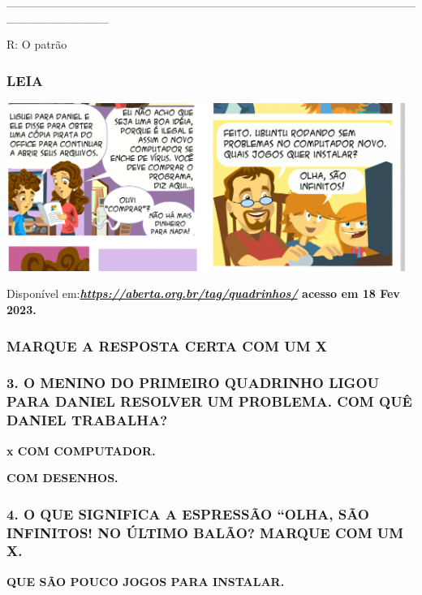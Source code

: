 \_\_\_\_\_\_\_\_\_\_\_\_\_\_\_\_\_\_\_\_\_\_\_\_\_\_\_\_\_\_\_\_\_\_\_\_\_\_\_\_\_\_\_\_\_\_\_\_\_\_\_\_\_\_\_\_\_\_\_\_

R: O patrão

\subsubsection{LEIA}\label{leia-2}

\includegraphics[width=5.11873in,height=2.15447in]{media/image172.png}

Disponível
em:\textbf{\href{https://aberta.org.br/tag/quadrinhos/}{\emph{https://aberta.org.br/tag/quadrinhos/}}
acesso em 18 Fev 2023.}

\subsubsection{MARQUE A RESPOSTA CERTA COM UM X
}\label{marque-a-resposta-certa-com-um-x}

\subsubsection{3. O MENINO DO PRIMEIRO QUADRINHO LIGOU PARA DANIEL
RESOLVER UM PROBLEMA. COM QUÊ DANIEL
TRABALHA?}\label{o-menino-do-primeiro-quadrinho-ligou-para-daniel-resolver-um-problema.-com-quuxea-daniel-trabalha}

\textbf{x COM COMPUTADOR.}

\textbf{COM DESENHOS.}

\subsubsection{4. O QUE SIGNIFICA A ESPRESSÃO ``OLHA, SÃO INFINITOS! NO
ÚLTIMO BALÃO? MARQUE COM UM
X.}\label{o-que-significa-a-espressuxe3o-olha-suxe3o-infinitos-no-uxfaltimo-baluxe3o-marque-com-um-x.}

\textbf{QUE SÃO POUCO JOGOS PARA INSTALAR.}


